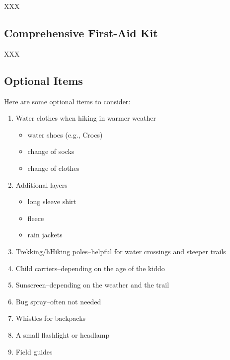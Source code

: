 \documentclass[
  letterpaper,
  DIV=11,
  numbers=noendperiod]{scrreprt}
\providecommand{\tightlist}{%
  \setlength{\itemsep}{0pt}\setlength{\parskip}{0pt}}\usepackage{longtable,booktabs,array}
\begin{document}
XXX

\subsection{Comprehensive First-Aid
Kit}\label{comprehensive-first-aid-kit}

XXX

\subsection{Optional Items}\label{optional-items}

Here are some optional items to consider:

\begin{enumerate}
\def\labelenumi{\arabic{enumi}.}
\tightlist
\item
  Water clothes when hiking in warmer weather

  \begin{itemize}
  \tightlist
  \item
    water shoes (e.g., Crocs)
  \item
    change of socks
  \item
    change of clothes
  \end{itemize}
\item
  Additional layers

  \begin{itemize}
  \tightlist
  \item
    long sleeve shirt
  \item
    fleece
  \item
    rain jackets
  \end{itemize}
\item
  Trekking/hHiking poles--helpful for water crossings and steeper trails
\item
  Child carriers--depending on the age of the kiddo
\item
  Sunscreen--depending on the weather and the trail
\item
  Bug spray--often not needed
\item
  Whistles for backpacks
\item
  A small flashlight or headlamp
\item
  Field guides
\end{enumerate}
\end{document}
